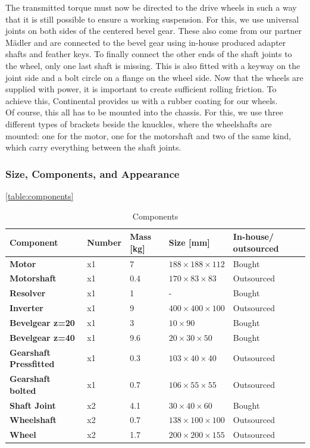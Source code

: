 The transmitted torque must now be directed to the drive wheels in such a way that it is still possible to ensure a working suspension. For this, we use universal joints on both sides of the centered bevel gear. These also come from our partner Mädler and are connected to the bevel gear using in-house produced adapter shafts and feather keys. To finally connect the other ends of the shaft joints to the wheel, only one last shaft is missing. This is also fitted with a keyway on the joint side and a bolt circle on a flange on the wheel side. Now that the wheels are supplied with power, it is important to create sufficient rolling friction. To achieve this, Continental provides us with a rubber coating for our wheels. \\
Of course, this all has to be mounted into the chassis. For this, we use three different types of brackets beside the knuckles, where the wheelshafts are mounted: one for the motor, one for the motorshaft and two of the same kind, which carry everything between the shaft joints.

\subsubsection{Size, Components, and Appearance}

\autoref{table:components}
\begin{table}[ht]
\centering
\begin{adjustbox}{width=\textwidth}
\begin{tabular}{|>{\bfseries}m{2.5cm}|m{1.4cm}|m{1.7cm}|m{2.9cm}|m{2.2cm}|}
\hline
Component & Number & Mass [kg] & Size [mm] &  In-house/ outsourced \\
\hline
Motor & x1 & 7 & \(188 \times 188 \times 112\) &   Bought \\
Motorshaft & x1 & 0.4 & \(170 \times 83\times 83\) &Outsourced \\
Resolver & x1 & 1 & - &  Bought \\
Inverter & x1 & 9 & \(400 \times 400 \times 100\) &  Outsourced \\
Bevelgear z=20 & x1 & 3 & \(10 \times 90\) &  Bought \\
Bevelgear z=40 & x1 & 9.6 & \(20 \times 30 \times 50\) &Bought \\
Gearshaft Pressfitted & x1 & 0.3 & \(103 \times 40 \times 40\) & Outsourced \\
Gearshaft bolted & x1 & 0.7 & \(106 \times 55 \times 55\) &Outsourced \\
Shaft Joint & x2 & 4.1 & \(30 \times 40 \times 60\) &  Bought \\
Wheelshaft & x2 & 0.7 & \(138 \times 100 \times 100\) &   Outsourced \\
Wheel & x2 & 1.7 & \(200 \times 200 \times 155\) &  Outsourced \\
\hline
\end{tabular}
\end{adjustbox}
\caption{Components}
\label{table:components}
\end{table}

